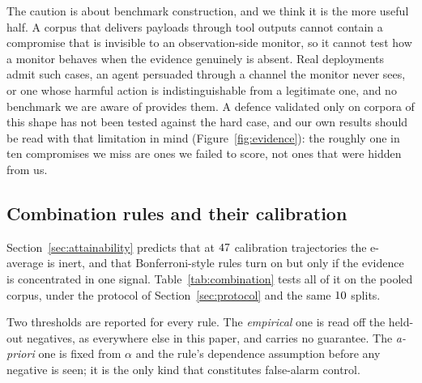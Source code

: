 \documentclass[pdflatex,sn-basic]{sn-jnl}%
\theoremstyle{thmstyleone}
\theoremstyle{thmstyletwo}
\theoremstyle{thmstylethree}
\begin{document}
The caution is about benchmark construction, and we think it is the more useful
half. A corpus that delivers payloads through tool outputs cannot contain a
compromise that is invisible to an observation-side monitor, so it cannot test how
a monitor behaves when the evidence genuinely is absent. Real deployments admit
such cases, an agent persuaded through a channel the monitor never sees, or one
whose harmful action is indistinguishable from a legitimate one, and no benchmark
we are aware of provides them. A defence validated only on corpora of this shape
has not been tested against the hard case, and our own results should be read with
that limitation in mind (Figure~\ref{fig:evidence}): the roughly one in ten
compromises we miss are ones we failed to score, not ones that were hidden from
us.

\subsection{Combination rules and their calibration}
\label{sec:combination}

Section~\ref{sec:attainability} predicts that at $47$ calibration
trajectories the e-average is inert, and that Bonferroni-style rules turn on but
only if the evidence is concentrated in one signal. Table~\ref{tab:combination}
tests all of it on the pooled corpus, under the protocol of
Section~\ref{sec:protocol} and the same $10$ splits.

Two thresholds are reported for every rule. The \emph{empirical} one is read off
the held-out negatives, as everywhere else in this paper, and carries no
guarantee. The \emph{a-priori} one is fixed from $\alpha$ and the rule's
dependence assumption before any negative is seen; it is the only kind that
constitutes false-alarm control.
\end{document}
